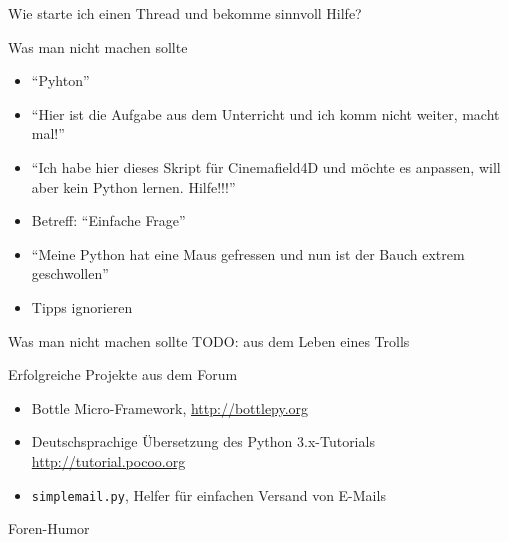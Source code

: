\documentclass{beamer}
\begin{document}
\begin{frame}{Wie starte ich einen Thread und bekomme sinnvoll Hilfe?}
\end{frame}

\begin{frame}{Was man nicht machen sollte}
  \begin{itemize}
    \item \enquote{Pyhton} 
    \item \enquote{Hier ist die Aufgabe aus dem Unterricht und ich komm nicht weiter,
      macht mal!}
    \item \enquote{Ich habe hier dieses Skript für Cinemafield4D und möchte es
      anpassen, will aber kein Python lernen. Hilfe!!!}
    \item Betreff: \enquote{Einfache Frage}
    \item \enquote{Meine Python hat eine Maus gefressen und nun ist der Bauch extrem geschwollen} 
    \item Tipps ignorieren
  \end{itemize}
\end{frame}

\begin{frame}{Was man nicht machen sollte}
  TODO: aus dem Leben eines Trolls
\end{frame}

\begin{frame}{Erfolgreiche Projekte aus dem Forum}
  \begin{itemize}
    \item Bottle Micro-Framework, \url{http://bottlepy.org}
    \item Deutschsprachige Übersetzung des Python 3.x-Tutorials \url{http://tutorial.pocoo.org}
    \item \texttt{simplemail.py}, Helfer für einfachen Versand von E-Mails
  \end{itemize}
\end{frame}

\begin{frame}{Foren-Humor}
\end{frame}
\end{document}
